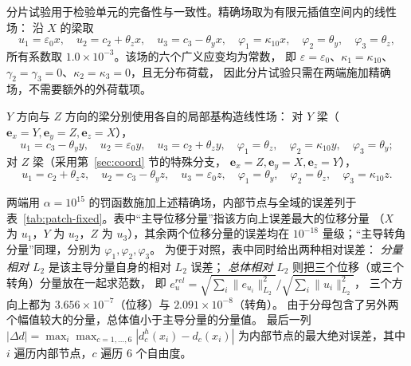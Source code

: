 \documentclass[UTF8,a4paper,11pt]{ctexart}
\begin{document}
分片试验用于检验单元的完备性与一致性。精确场取为有限元插值空间内的线性场：
沿 $X$ 的梁取
\begin{equation}\label{eq:patchX}
u_1=\varepsilon_0x,\quad
u_2=c_2+\theta_zx,\quad
u_3=c_3-\theta_yx,\quad
\varphi_1=\kappa_{10}x,\quad
\varphi_2=\theta_y,\quad
\varphi_3=\theta_z,
\end{equation}
所有系数取 $1.0\times10^{-3}$。该场的六个广义应变均为常数，
即 $\varepsilon=\varepsilon_0$、$\kappa_1=\kappa_{10}$、
$\gamma_2=\gamma_3=0$、$\kappa_2=\kappa_3=0$，且无分布荷载，
因此分片试验只需在两端施加精确场，不需要额外的外荷载项。

$Y$ 方向与 $Z$ 方向的梁分别使用各自的局部基构造线性场：
对 $Y$ 梁（$\mathbf{e}_x=Y,\mathbf{e}_y=Z,\mathbf{e}_z=X$），
\begin{equation}\label{eq:patchY}
u_1=c_3-\theta_yy,\quad
u_2=\varepsilon_0y,\quad
u_3=c_2+\theta_zy,\quad
\varphi_1=\theta_z,\quad
\varphi_2=\kappa_{10}y,\quad
\varphi_3=\theta_y;
\end{equation}
对 $Z$ 梁（采用第~\ref{sec:coord} 节的特殊分支，
$\mathbf{e}_x=Z,\mathbf{e}_y=X,\mathbf{e}_z=Y$），
\begin{equation}\label{eq:patchZ}
u_1=c_2+\theta_zz,\quad
u_2=c_3-\theta_yz,\quad
u_3=\varepsilon_0z,\quad
\varphi_1=\theta_y,\quad
\varphi_2=\theta_z,\quad
\varphi_3=\kappa_{10}z.
\end{equation}

两端用 $\alpha=10^{15}$ 的罚函数施加上述精确场，内部节点与全域的误差列于
表~\ref{tab:patch-fixed}。表中“主导位移分量”指该方向上误差最大的位移分量
（$X$ 为 $u_1$，$Y$ 为 $u_2$，$Z$ 为 $u_3$），其余两个位移分量的误差均在
$10^{-18}$ 量级；“主导转角分量”同理，分别为 $\varphi_1,\varphi_2,\varphi_3$。
为便于对照，表中同时给出两种相对误差：
\emph{分量相对 $L_2$} 是该主导分量自身的相对 $L_2$ 误差；
\emph{总体相对 $L_2$} 则把三个位移（或三个转角）分量放在一起求范数，
即
$e_u^{rel}=\sqrt{\sum_i\|e_{u_i}\|_{L_2}^2}\big/\sqrt{\sum_i\|u_i\|_{L_2}^2}$，
三个方向上都为 $3.656\times10^{-7}$（位移）与 $2.091\times10^{-8}$（转角）。
由于分母包含了另外两个幅值较大的分量，总体值小于主导分量的分量值。
最后一列
$|\Delta d|=\max_i\max_{c=1,\dots,6}\left|d_c^h(x_i)-d_c(x_i)\right|$
为内部节点的最大绝对误差，其中 $i$ 遍历内部节点，$c$ 遍历 6 个自由度。
\end{document}
